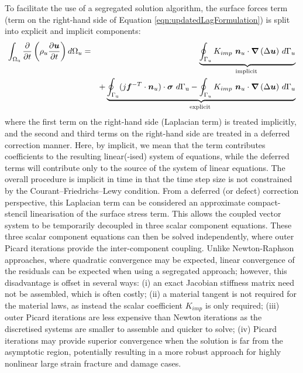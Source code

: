 \documentclass[sn-mathphys,Numbered]{sn-jnl}%
\newcommand{\bb}{\boldsymbol}
\begin{document}
To facilitate the use of a segregated solution algorithm, the surface forces term (term on the right-hand side of Equation \ref{eqn:updatedLagFormulation}) is split into explicit and implicit components:
\begin{eqnarray} \label{eqn:MomentumImplicitExplicit}
	\int_{\mathrm{\Omega_u}} \frac{\partial }{\partial t} \left( \rho_u \frac{\partial \bb{u} }{\partial t} \right) d\mathrm{\Omega}_u
	&=&
	\underbrace{\oint_{\mathrm{\Gamma}_u}{K_{imp}\  \bb{n}_u\cdot\bb{\nabla}\left(\Delta \bb{u} \right)}\ d\mathrm{\Gamma}_u}_{\text {implicit }} \notag \\
    &&+
    \underbrace{
    \oint_{\mathrm{\Gamma_u}}(j\bb{f}^{-T}\cdot{\bb{n}_u) \cdot \boldsymbol{\sigma}}\ d\mathrm{\Gamma_u}
    - 
    \oint_{\mathrm{\Gamma}_u}{K_{imp}\ 
 \bb{n}_u \cdot \bb{\nabla}\left(\Delta \bb{u}\right)}\ d\Gamma_u
 }_{\text {explicit }}  %
\end{eqnarray}
where the first term on the right-hand side (Laplacian term) is treated implicitly, and the second and third terms on the right-hand side are treated in a deferred correction manner.
Here, by implicit, we mean that the term contributes coefficients to the resulting linear(-ised) system of equations, while the deferred terms will contribute only to the source of the system of linear equations.
The overall procedure is implicit in time in that the time step size is not constrained by the Courant–Friedrichs–Lewy condition.
From a deferred (or defect) correction perspective, this Laplacian term can be considered an approximate compact-stencil linearisation of the surface stress term.
This allows the coupled vector system to be temporarily decoupled in three scalar component equations.
These three scalar component equations can then be solved independently, where outer Picard iterations provide the inter-component coupling.
Unlike Newton-Raphson approaches, where quadratic convergence may be expected, linear convergence of the residuals can be expected when using a segregated approach; however, this disadvantage is offset in several ways: (i) an exact Jacobian stiffness matrix need not be assembled, which is often costly; (ii) a material tangent is not required for the material laws, as instead the scalar coefficient $K_{imp}$ is only required; (iii) outer Picard iterations are less expensive than Newton iterations as the discretised systems are smaller to assemble and quicker to solve; (iv) Picard iterations may provide superior convergence when the solution is far from the asymptotic region, potentially resulting in a more robust approach for highly nonlinear large strain fracture and damage cases.
\end{document}
